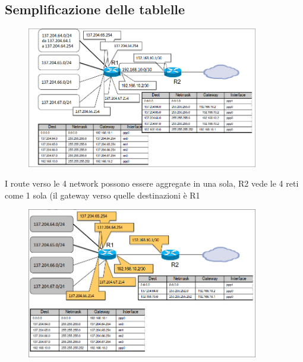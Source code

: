 \documentclass{report}
\begin{document}
            \subsection{Semplificazione delle tablelle}
                \begin{figure}[H]
                    \includegraphics[width=0.9\textwidth]{1/sempTab1.png}
                \end{figure}
                I route verso le 4 network possono essere aggregate in una sola, R2 vede le 4 reti come 1 sola (il gateway verso quelle destinazioni è R1
                 \begin{figure}[H]
                    \includegraphics[width=0.9\textwidth]{1/sempTab.png}
                \end{figure}
\end{document}
